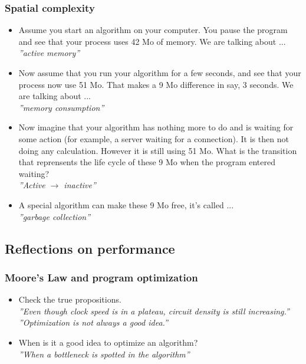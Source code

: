 \documentclass[fr,license=none]{../../../eplsummary}
\begin{document}
			\subsubsection*{Spatial complexity}
				\begin{itemize}
					\item Assume you start an algorithm on your computer. You pause the program and see that your process uses 42 Mo of memory. We are talking about ...\\
						\textit{''active memory''}
					\item Now assume that you run your algorithm for a few seconds, and see that your process now use 51 Mo. That makes a 9 Mo difference in say, 3 seconds. We are talking about ...\\
						\textit{''memory consumption''}
					\item Now imagine that your algorithm has nothing more to do and is waiting for some action (for example, a server waiting for a connection). It is then not doing any calculation. However it is still using 51 Mo. What is the transition that reprensents the life cycle of these 9 Mo when the program entered waiting?\\
						\textit{''Active $\rightarrow$ inactive''}
					\item A special algorithm can make these 9 Mo free, it's called ...\\
						\textit{''garbage collection''}
				\end{itemize}
		\subsection{Reflections on performance}
			\subsubsection*{Moore's Law and program optimization}
				\begin{itemize}
					\item Check the true propositions.\\
						\textit{''Even though clock speed is in a plateau, circuit density is still increasing.''}\\
						\textit{''Optimization is not always a good idea.''}
					\item When is it a good idea to optimize an algorithm?\\
						\textit{''When a bottleneck is spotted in the algorithm''}
				\end{itemize}
\end{document}
